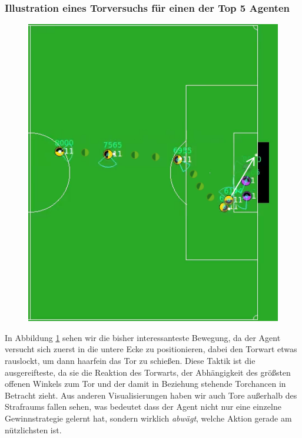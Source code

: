         \subsubsection*{Illustration eines Torversuchs für einen der Top 5 Agenten}
        \begin{figure}[H]
            \begin{center}
                \includegraphics[scale=0.83]{../pictures/games/neural-evo-gameplay.png}\\
                \caption{\label{fig:neural-evo-gameplay}}
            \end{center}
        \end{figure}
        In Abbildung \ref{fig:neural-evo-gameplay} sehen wir die bisher interessanteste Bewegung, da der Agent versucht sich zuerst in die untere Ecke zu positionieren, dabei den Torwart etwas rauslockt, um dann haarfein das Tor zu schießen. Diese Taktik ist die ausgereifteste, da sie die Reaktion des Torwarts, der Abhängigkeit des größsten offenen Winkels zum Tor und der damit in Beziehung stehende Torchancen in Betracht zieht. Aus anderen Visualisierungen haben wir auch Tore außerhalb des Strafraums fallen sehen, was bedeutet dass der Agent nicht nur eine einzelne Gewinnstrategie gelernt hat, sondern wirklich \textit{abwägt}, welche Aktion gerade am nützlichsten ist.
\newpage
